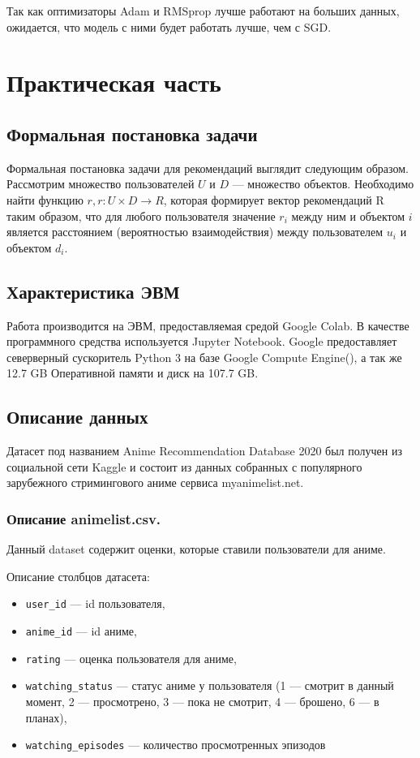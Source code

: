 \documentclass[bachelor, och, diploma]{SCWorks}
\begin{document}
Так как оптимизаторы Adam и RMSprop  лучше работают на больших данных, ожидается, что модель с ними будет работать лучше, чем с SGD.


\section{Практическая часть}
\subsection{Формальная постановка задачи}
Формальная постановка задачи для рекомендаций выглядит следующим образом. 
Рассмотрим множество пользователей $U$ и $D$ --- множество объектов. 
Необходимо найти функцию $r, r : U \times D \rightarrow R$, которая
 формирует вектор рекомендаций R таким образом, что для любого пользователя
значение $r_i$ между ним и объектом $i$ является расстоянием 
  (вероятностью взаимодействия)  между пользователем $u_i$ и объектом $d_i$.

\subsection{Характеристика ЭВМ}
Работа производится на ЭВМ, предоставляемая средой Google Colab. В качестве программного средства используется Jupyter Notebook.
Google предоставляет северверный сускоритель Python 3 на базе Google Compute Engine(), а так же 12.7 GB Оперативной памяти и диск на 107.7 GB.

\subsection{Описание данных}

Датасет под названием Anime Recommendation Database 2020 был получен из социальной сети Kaggle и состоит из данных собранных с популярного зарубежного стримингового аниме сервиса myanimelist.net.

\subsubsection{Описание animelist.csv.}
Данный dataset содержит оценки, которые ставили пользователи для аниме.

Описание столбцов датасета:
\begin{itemize}
	\item \verb|user_id| --- id пользователя,
	\item \verb|anime_id| --- id аниме,
	\item \verb|rating|  --- оценка пользователя для аниме,
	\item \verb|watching_status|  --- статус аниме у пользователя (1 --- смотрит в данный момент, 2 --- просмотрено, 3 --- пока не смотрит, 4 --- брошено, 6 --- в планах),
	\item \verb|watching_episodes| --- количество просмотренных эпизодов
\end{itemize}
\end{document}
